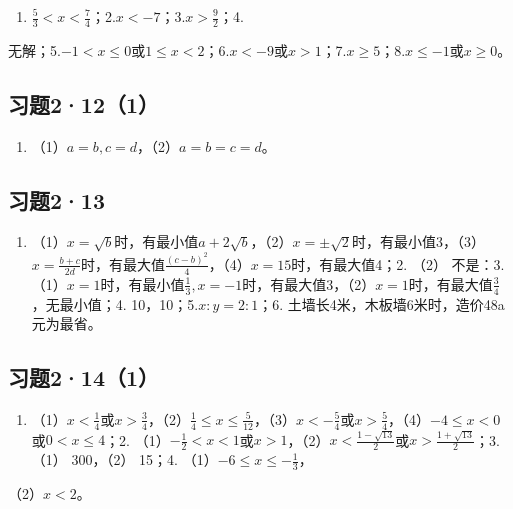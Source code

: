 \begin{enumerate}[start=1]
\item
  \(\frac{5}{3} < x < \frac{7}{4}\)；2.\(x < -7\)；3.\(x > \frac{9}{2}\)；4.
\end{enumerate}
无解；5.\(-1 < x \leqslant 0\)或\(1 \leqslant x < 2\)；6.\(x < -9\)或\(x > 1\)；7.\(x \geqslant 5\)；8.\(x \leqslant -1\)或\(x \geqslant 0\)。

\subsection{习题2·12（1）}

\begin{enumerate}[start=6]
\item
  （1）\(a = b, c = d\)，（2）\(a = b = c = d\)。
\end{enumerate}

\subsection{习题2·13}

\begin{enumerate}
\item
  （1）\(x = \sqrt{b}\)时，有最小值\(a + 2\sqrt{b}\)，（2）\(x = \pm \sqrt{2}\)时，有最小值3，（3）\(x = \frac{b + c}{2d}\)时，有最大值\(\frac{(c - b)^2}{4}\)，（4）\(x = 15\)时，有最大值4；2.
  （2） 不是：3.
  （1）\(x = 1\)时，有最小值\(\frac{1}{3}, x = -1\)时，有最大值3，（2）\(x = 1\)时，有最大值\(\frac{3}{4}\)，无最小值；4.
  10，10；5.\(x: y = 2: 1\)；6.
  土墙长4米，木板墙6米时，造价48a元为最省。
\end{enumerate}

\subsection{习题2·14（1）}

\begin{enumerate}
\item
  （1）\(x < \frac{1}{4}\)或\(x > \frac{3}{4}\)，（2）\(\frac{1}{4} \leqslant x \leqslant \frac{5}{12}\)，（3）\(x < -\frac{5}{4}\)或\(x > \frac{5}{4}\)，（4）\(-4 \leqslant x < 0\)或\(0 < x \leqslant 4\)；2.
  （1）\(-\frac{1}{2} < x < 1\)或\(x > 1\)，（2）\(x < \frac{1 - \sqrt{13}}{2}\)或\(x > \frac{1 + \sqrt{13}}{2}\)；3.
  （1） 300，（2） 15；4.
  （1）\(-6 \leqslant x \leqslant -\frac{1}{3}\)，
\end{enumerate}

（2）\(x < 2\)。

